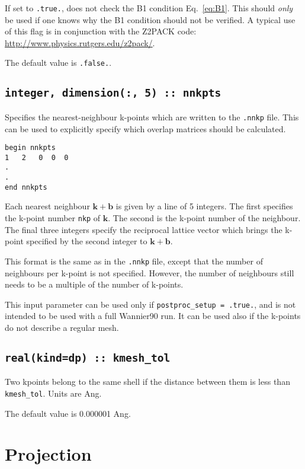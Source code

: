 If set to \texttt{.true.}, does not check the B1 condition
Eq.~\ref{eq:B1}. This should \emph{only} be used if one knows
why the B1 condition should not be verified. A typical use of this
flag is in conjunction with the Z2PACK code:
\url{http://www.physics.rutgers.edu/z2pack/}.

The default value is \texttt{.false.}.

\subsection[nnkpts]{\tt integer, dimension(:, 5) :: nnkpts}

Specifies the nearest-neighbour k-points which are written to the \texttt{.nnkp} file. This can be used to explicitly specify which overlap matrices should be calculated.

\begin{verbatim}
begin nnkpts
1   2   0  0  0
.
.
end nnkpts
\end{verbatim}

Each nearest neighbour $\mathbf{k + b}$ is given by a line of 5 integers. The first specifies the k-point number \texttt{nkp} of $\mathbf{k}$. The second is the k-point number of the neighbour. The final three integers specify the reciprocal lattice vector which brings the k-point specified by the second integer to $\mathbf{k + b}$.

This format is the same as in the \texttt{.nnkp} file, except that the number of neighbours per k-point is not specified. However, the number of neighbours still needs to be a multiple of the number of k-points.

This input parameter can be used only if \texttt{postproc\_setup = .true.}, and is not intended to be used with a full Wannier90 run. It can be used also if the k-points do not describe a regular mesh.

\subsection[kmesh\_tol]{\tt real(kind=dp) :: kmesh\_tol}

Two kpoints belong to the same shell if the distance between them is
less than {\tt kmesh\_tol}.
Units are Ang.

The default value is 0.000001 Ang.

\section{Projection}


